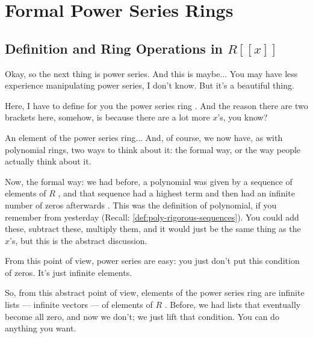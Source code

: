 \begin{hidden}
\end{hidden}

\section{Formal Power Series Rings}

\subsection{Definition and Ring Operations in \texorpdfstring{$R[[x]]$}{R[[x]]}}

\begin{speech}[00:25:19 - 00:27:02]

Okay, so the next thing is power series. And this is maybe... You may have less experience manipulating power series, I don't know. But it's a beautiful thing.

Here, I have to define for you the power series ring . And the reason there are two brackets here, somehow, is because there are a lot more $x$'s, you know? 

An element of the power series ring... And, of course, we now have, as with polynomial rings, two ways to think about it: the formal way, or the way people actually think about it.

Now, the formal way: we had before, a polynomial was given by a sequence of elements of $R$ , and that sequence had a highest term and then had an infinite number of zeros afterwards . This was the definition of polynomial, if you remember from yesterday (Recall: \cref{def:poly-rigorous-sequences}). You could add these, subtract these, multiply them, and it would just be the same thing as the $x$'s, but this is the abstract discussion.

From this point of view, power series are easy: you just don't put this condition of zeros. It's just infinite elements. 

So, from this abstract point of view, elements of the power series ring are infinite lists --- infinite vectors --- of elements of $R$ . Before, we had lists that eventually become all zero, and now we don't; we just lift that condition. You can do anything you want.
\end{speech}

